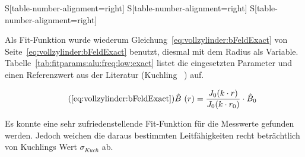{\begin{minipage}[t]{0.33\textwidth}
\begin{minipage}[t]{0.5\textwidth}
\begin{center}
\begin{tabular}{
                    S[table-number-alignment=right]
                    S[table-number-alignment=right]
                    S[table-number-alignment=right]
                    }
                \end{tabular}
            \end{center}
        \end{minipage}%
        \begin{minipage}[t]{0.5\textwidth}
            \vspace{0mm}
            Als             Fit-Funktion            wurde             wiederum
            Gleichung~\ref{eq:vollzylinder:bFeldExact}                     von
            Seite~\ref{eq:vollzylinder:bFeldExact}       benutzt,      diesmal
            mit           dem          Radius           als          Variable.
            Tabelle~\ref{tab:fitparams:alu:freq:low:exact}      listet     die
            eingesetzten Parameter  und einen  Referenzwert aus  der Literatur
            (Kuchling ~\cite{ref:kuchling:resistivityTable}) auf.

            \begin{equation}
                \tag{\ref{eq:vollzylinder:bFeldExact}}
                \hat{B}~(r) = \frac{J_0 (k \cdot r)}{J_0 (k \cdot r_0)} \cdot \hat{B}_0
            \end{equation}

            Es  konnte eine  sehr  zufriedenstellende  Fit-Funktion f\"ur  die
            Messwerte  gefunden werden. Jedoch  weichen die  daraus bestimmten
            Leitf\"ahigkeiten   recht   betr\"achtlich  von   Kuchlings   Wert
            $\sigma_{Kuch}$ ab.
        \end{minipage}%


\end{minipage}}

